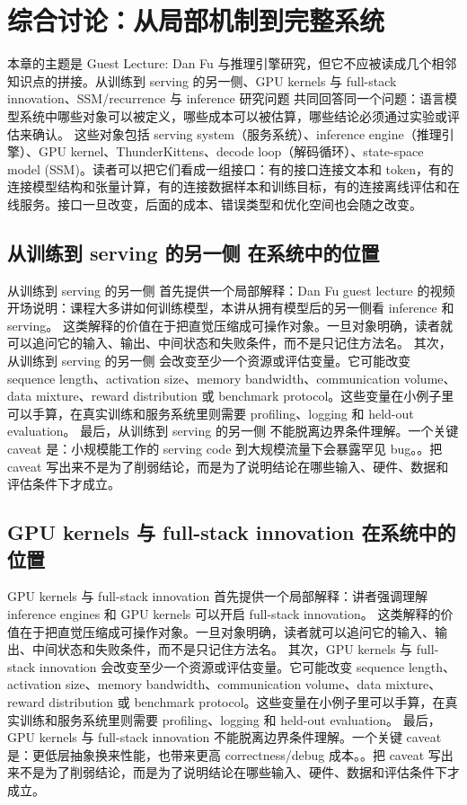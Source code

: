 \documentclass[a4paper]{article}
\begin{document}
\section{综合讨论：从局部机制到完整系统}
本章的主题是 Guest Lecture: Dan Fu 与推理引擎研究，但它不应被读成几个相邻知识点的拼接。从训练到 serving 的另一侧、GPU kernels 与 full-stack innovation、SSM/recurrence 与 inference 研究问题 共同回答同一个问题：语言模型系统中哪些对象可以被定义，哪些成本可以被估算，哪些结论必须通过实验或评估来确认。
这些对象包括 serving system（服务系统）、inference engine（推理引擎）、GPU kernel、ThunderKittens、decode loop（解码循环）、state-space model (SSM)。读者可以把它们看成一组接口：有的接口连接文本和 token，有的连接模型结构和张量计算，有的连接数据样本和训练目标，有的连接离线评估和在线服务。接口一旦改变，后面的成本、错误类型和优化空间也会随之改变。
\subsection{从训练到 serving 的另一侧 在系统中的位置}
从训练到 serving 的另一侧 首先提供一个局部解释：Dan Fu guest lecture 的视频开场说明：课程大多讲如何训练模型，本讲从拥有模型后的另一侧看 inference 和 serving。 这类解释的价值在于把直觉压缩成可操作对象。一旦对象明确，读者就可以追问它的输入、输出、中间状态和失败条件，而不是只记住方法名。
其次，从训练到 serving 的另一侧 会改变至少一个资源或评估变量。它可能改变 sequence length、activation size、memory bandwidth、communication volume、data mixture、reward distribution 或 benchmark protocol。这些变量在小例子里可以手算，在真实训练和服务系统里则需要 profiling、logging 和 held-out evaluation。
最后，从训练到 serving 的另一侧 不能脱离边界条件理解。一个关键 caveat 是：小规模能工作的 serving code 到大规模流量下会暴露罕见 bug。。把 caveat 写出来不是为了削弱结论，而是为了说明结论在哪些输入、硬件、数据和评估条件下才成立。
\subsection{GPU kernels 与 full-stack innovation 在系统中的位置}
GPU kernels 与 full-stack innovation 首先提供一个局部解释：讲者强调理解 inference engines 和 GPU kernels 可以开启 full-stack innovation。 这类解释的价值在于把直觉压缩成可操作对象。一旦对象明确，读者就可以追问它的输入、输出、中间状态和失败条件，而不是只记住方法名。
其次，GPU kernels 与 full-stack innovation 会改变至少一个资源或评估变量。它可能改变 sequence length、activation size、memory bandwidth、communication volume、data mixture、reward distribution 或 benchmark protocol。这些变量在小例子里可以手算，在真实训练和服务系统里则需要 profiling、logging 和 held-out evaluation。
最后，GPU kernels 与 full-stack innovation 不能脱离边界条件理解。一个关键 caveat 是：更低层抽象换来性能，也带来更高 correctness/debug 成本。。把 caveat 写出来不是为了削弱结论，而是为了说明结论在哪些输入、硬件、数据和评估条件下才成立。
\end{document}
